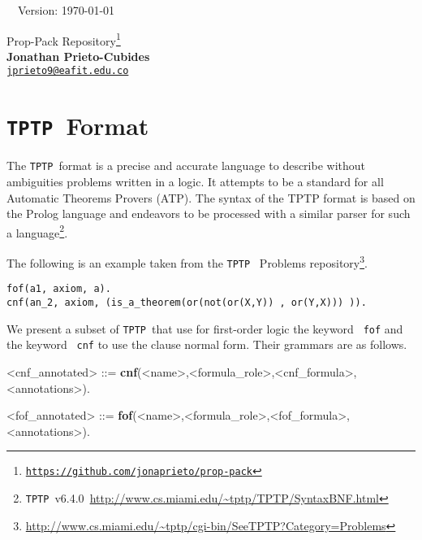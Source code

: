 \documentclass[12pt]{article}
\newcommand{\tptp}[0]{\texorpdfstring{\texttt{TPTP}}\ \ }
\newcommand{\ttext}[1]{\texttt{\color{black} #1}}
\begin{document}

\hrulefill\ \ Version: \today\\

\vspace{3mm}
\begin{center}
{\Large Prop-Pack Repository\footnote{
\href{https://github.com/jonaprieto/prop-pack}{{\color{blue(munsell)}
\texttt{https://github.com/jonaprieto/prop-pack}}}}
}\\
\textbf{Jonathan Prieto-Cubides}\\ %
\href{mailto:jprieto9@eafit.edu.co}{{\color{blue(munsell)}\texttt{jprieto9@eafit.edu.co}}}
\end{center}
\vspace{0.1 cm}

\tableofcontents

\section{\tptp Format}
The \tptp format is a precise and accurate language to describe without ambiguities problems written in a logic. It attempts to be a standard for all Automatic Theorems Provers (ATP). The syntax of the TPTP format is based on the Prolog language and endeavors to be processed with a similar parser for such a language\footnote{\tptp v6.4.0~\url{http://www.cs.miami.edu/~tptp/TPTP/SyntaxBNF.html}}.\par

The following is an example taken from the \tptp
Problems repository\footnote{\url{http://www.cs.miami.edu/~tptp/cgi-bin/SeeTPTP?Category=Problems}}.

\begin{lstlisting}
fof(a1, axiom, a).
cnf(an_2, axiom, (is_a_theorem(or(not(or(X,Y)) , or(Y,X))) )).
\end{lstlisting}

We present a subset of \tptp that use for first-order logic the keyword \ttext{fof} and the keyword \ttext{cnf} to use the clause normal form. Their grammars are as follows.

\label{syntax:fof}
\begin{grammar}
<cnf_annotated> ::= \textbf{cnf}(<name>,<formula_role>,<cnf_formula>,<annotations>).

<fof_annotated> ::= \textbf{fof}(<name>,<formula_role>,<fof_formula>,<annotations>).
\end{grammar}
\end{document}
